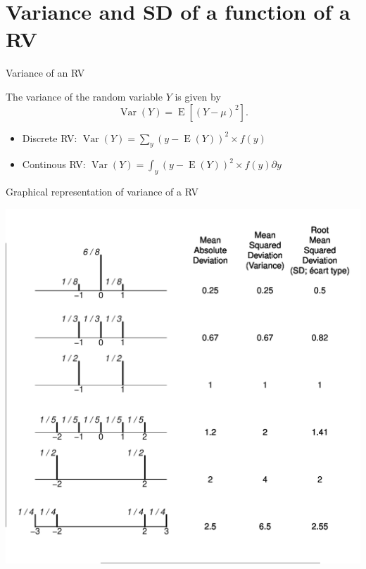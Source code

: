 \documentclass[10pt]{beamer}\usepackage[]{graphicx}\usepackage[]{color}
\newenvironment{knitrout}{}{} %
\newcommand{\Var}{\operatorname{Var}}
\newcommand{\Expec}{\operatorname{E}}
\begin{document}
\section{Variance and SD of a function of a RV}

\begin{frame}{Variance of an RV}
	\begin{definition}
The variance of the random variable $Y$ is given by $$\Var(Y) = \Expec[(Y - \mu)^2].$$ 
\begin{itemize}
	\item Discrete RV: $\Var(Y) = \sum_y (y - \Expec(Y))^2 \times f(y)$
	\item Continous RV: $\Var(Y) = \int_y (y - \Expec(Y))^2 \times f(y) \partial y$
\end{itemize}
	\end{definition}


\end{frame}

\begin{frame}[fragile]{Graphical representation of variance of a RV}
\begin{knitrout}\tiny
{}\color{fgcolor}

{\centering \includegraphics[width=0.85\linewidth]{figure/unnamed-chunk-6-1} 

}


\end{knitrout}
	
\end{frame}
\end{document}
